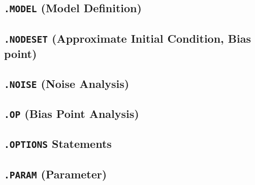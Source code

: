 \newpage
\subsection{\texttt{.MODEL} (Model Definition)}



\newpage
\subsection{\texttt{.NODESET} (Approximate Initial Condition, Bias point)}


\newpage
\subsection{\texttt{.NOISE} (Noise Analysis) }
 



\newpage
\subsection{\texttt{.OP} (Bias Point Analysis)}


\newpage
\subsection{\texttt{.OPTIONS} Statements}


\newpage
\subsection{\texttt{.PARAM} (Parameter)}



